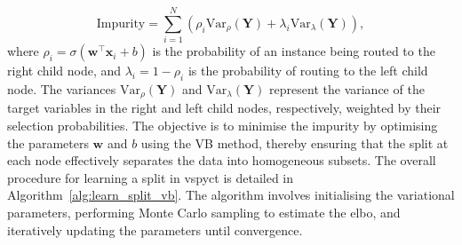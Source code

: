 \documentclass[3p,review,authoryear]{elsarticle}
\begin{document}
\begin{equation}
\text{Impurity} = \sum_{i=1}^{N} \left(\rho_i \text{Var}_{\rho}(\mathbf{Y}) + \lambda_i  \text{Var}_{\lambda}(\mathbf{Y})\right),
\end{equation}
where \(\rho_i = \sigma(\mathbf{w}^\top \mathbf{x}_i + b)\) is the probability of an instance being routed to the right child node, and \(\lambda_i = 1 - \rho_i\) is the probability of routing to the left child node.
The variances \(\text{Var}_{\rho}(\mathbf{Y})\) and \(\text{Var}_{\lambda}(\mathbf{Y})\) represent the variance of the target variables in the right and left child nodes, respectively, weighted by their selection probabilities.
The objective is to minimise the impurity by optimising the parameters \(\mathbf{w}\) and \(b\) using the VB method, thereby ensuring that the split at each node effectively separates the data into homogeneous subsets.
The overall procedure for learning a split in \gls{vspyct} is detailed in Algorithm~\ref{alg:learn_split_vb}.
The algorithm involves initialising the variational parameters, performing Monte Carlo sampling to estimate the \gls{elbo}, and iteratively updating the parameters until convergence.
\end{document}
